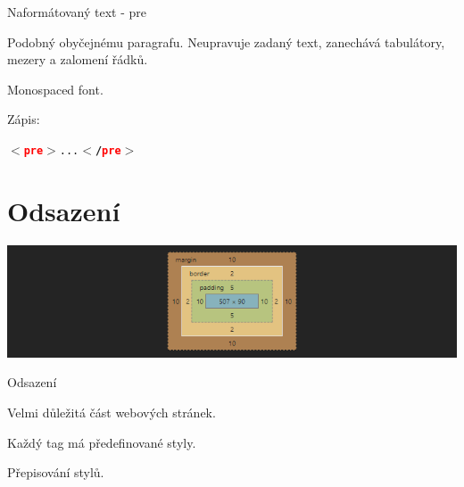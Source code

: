 \documentclass[aspectratio=1610]{beamer}
\begin{document}
\begin{frame}{Naformátovaný text - pre}
    \begin{cardTiny}
        \begin{flushleft}
            Podobný obyčejnému paragrafu. Neupravuje zadaný text, zanechává tabulátory, mezery a zalomení řádků.

            Monospaced font.

            \vspace{2ex}

            Zápis: \begin{alltt}\textbf{$<$\textcolor{red}{pre}$>$}...\textbf{$<$/\textcolor{red}{pre}$>$}\end{alltt}
        \end{flushleft}
    \end{cardTiny}
\end{frame}


\section{Odsazení}

\begin{frame}
    \begin{center}
        \includegraphics[width=\textwidth]{img/sizing-chromium.png}
    \end{center}
\end{frame}

\begin{frame}{Odsazení}
    \begin{cardTiny}
        \begin{flushleft}
            Velmi důležitá část webových stránek.

            \vspace{2ex}

            Každý tag má předefinované styly.
            
            \vspace{2ex}
        
            Přepisování stylů.
        \end{flushleft}
    \end{cardTiny}
\end{frame}
\end{document}
